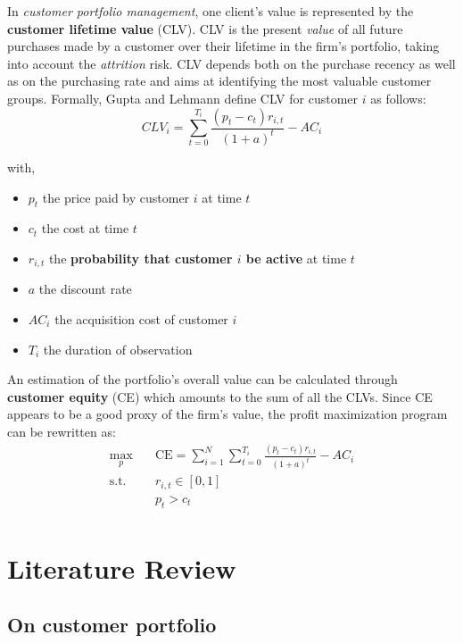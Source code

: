 \documentclass[
]{book}
\providecommand{\tightlist}{%
  \setlength{\itemsep}{0pt}\setlength{\parskip}{0pt}}
\begin{document}
In \emph{customer portfolio management}, one client's value is represented by the \textbf{customer lifetime value} (CLV). CLV is the present \emph{value} of all future purchases made by a customer over their lifetime in the firm's portfolio, taking into account the \emph{attrition} risk. CLV depends both on the purchase recency as well as on the purchasing rate and aims at identifying the most valuable customer groups. Formally, Gupta and Lehmann \citep{CUSTOMERS_ASSETS} define CLV for customer \(i\) as follows:
\[CLV_i = \sum_{t=0}^{T_i} \frac{(p_t - c_t)r_{i,t}}{(1+a)^t} - AC_i\]

with,

\begin{itemize}
\tightlist
\item
  \(p_t\) the price paid by customer \(i\) at time \(t\)
\item
  \(c_t\) the cost at time \(t\)
\item
  \(r_{i,t}\) the \textbf{probability that customer \(i\) be active} at time \(t\)
\item
  \(a\) the discount rate
\item
  \(AC_i\) the acquisition cost of customer \(i\)
\item
  \(T_i\) the duration of observation
\end{itemize}

An estimation of the portfolio's overall value can be calculated through \textbf{customer equity} (CE) which amounts to the sum of all the CLVs. Since CE appears to be a good proxy of the firm's value, the profit maximization program can be rewritten as:
\[ 
\begin{aligned}
\max_{p} \quad & \textrm{CE} = \sum_{i=1}^{N} \sum_{t=0}^{T_i} \frac{(p_t - c_t)r_{i,t}}{(1+a)^t} - AC_i\\
\textrm{s.t.} \quad & r_{i,t} \in [0, 1]\\
  &p_t > c_t    \\
\end{aligned}
\]

\hypertarget{literature}{%
\chapter{Literature Review}\label{literature}}

\hypertarget{portfolio}{%
\section{On customer portfolio}\label{portfolio}}
\end{document}
